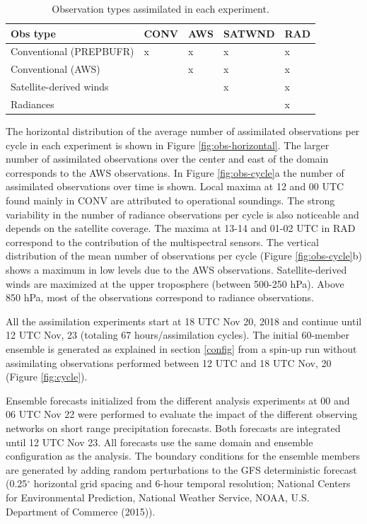 \documentclass[final,5p,times,twocolumn,authoryear]{elsarticle} %
\begin{document}
\begin{table}

\caption{\label{tab:table-exp}Observation types assimilated in each experiment.}
\centering
\begin{tabu} to 
\toprule
Obs type & CONV & AWS & SATWND & RAD\\
\midrule
Conventional (PREPBUFR) & x & x & x & x\\
Conventional (AWS) &  & x & x & x\\
Satellite-derived winds &  &  & x & x\\
Radiances &  &  &  & x\\
\bottomrule
\end{tabu}
\end{table}

The horizontal distribution of the average number of assimilated observations per cycle in each experiment is shown in Figure \ref{fig:obs-horizontal}. The larger number of assimilated observations over the center and east of the domain corresponds to the AWS observations. In Figure \ref{fig:obs-cycle}a the number of assimilated observations over time is shown. Local maxima at 12 and 00 UTC found mainly in CONV are attributed to operational soundings. The strong variability in the number of radiance observations per cycle is also noticeable and depends on the satellite coverage. The maxima at 13-14 and 01-02 UTC in RAD correspond to the contribution of the multispectral sensors. The vertical distribution of the mean number of observations per cycle (Figure \ref{fig:obs-cycle}b) shows a maximum in low levels due to the AWS observations. Satellite-derived winds are maximized at the upper troposphere (between 500-250 hPa). Above 850 hPa, most of the observations correspond to radiance observations.

All the assimilation experiments start at 18 UTC Nov 20, 2018 and continue until 12 UTC Nov, 23 (totaling 67 hours/assimilation cycles). The initial 60-member ensemble is generated as explained in section \ref{config} from a spin-up run without assimilating observations performed between 12 UTC and 18 UTC Nov, 20 (Figure \ref{fig:cycle}).

Ensemble forecasts initialized from the different analysis experiments at 00 and 06 UTC Nov 22 were performed to evaluate the impact of the different observing networks on short range precipitation forecasts. Both forecasts are integrated until 12 UTC Nov 23. All forecasts use the same domain and ensemble configuration as the analysis. The boundary conditions for the ensemble members are generated by adding random perturbations to the GFS deterministic forecast (0.25\(^{\circ}\) horizontal grid spacing and 6-hour temporal resolution; National Centers for Environmental Prediction, National Weather Service, NOAA, U.S. Department of Commerce (2015)).
\end{document}
